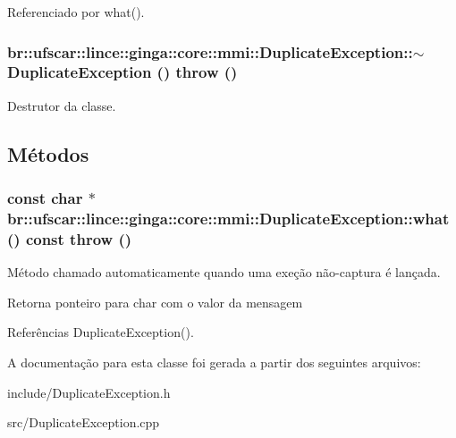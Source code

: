 Referenciado por what().

\subsubsection[{$\sim$DuplicateException}]{\setlength{\rightskip}{0pt plus 5cm}br::ufscar::lince::ginga::core::mmi::DuplicateException::$\sim$DuplicateException ()  throw ()\hspace{0.3cm}{\ttfamily  [virtual]}}\label{classbr_1_1ufscar_1_1lince_1_1ginga_1_1core_1_1mmi_1_1DuplicateException_a6b7fca1382694b9b2e074691e2cc7e50}
Destrutor da classe. 

\subsection{Métodos}
\subsubsection[{what}]{\setlength{\rightskip}{0pt plus 5cm}const char $\ast$ br::ufscar::lince::ginga::core::mmi::DuplicateException::what () const  throw ()\hspace{0.3cm}{\ttfamily  [virtual]}}\label{classbr_1_1ufscar_1_1lince_1_1ginga_1_1core_1_1mmi_1_1DuplicateException_aaab3d2b4e158fea6bb28d70485d93eee}
Método chamado automaticamente quando uma exeção não-\/captura é lançada. \begin{DoxyReturn}{Retorna}
ponteiro para char com o valor da mensagem 
\end{DoxyReturn}


Referências DuplicateException().



A documentação para esta classe foi gerada a partir dos seguintes arquivos:\begin{DoxyCompactItemize}
\item 
include/DuplicateException.h\item 
src/DuplicateException.cpp\end{DoxyCompactItemize}
